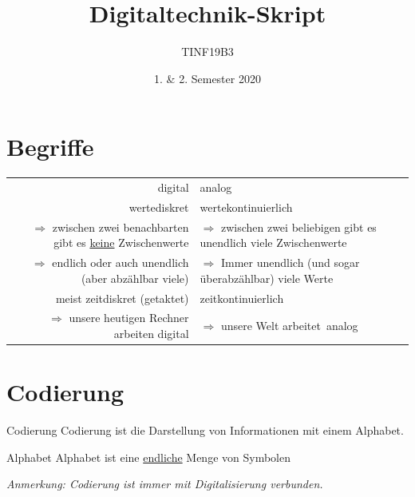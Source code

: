 \documentclass[10pt,a4paper]{scrartcl}
\author{TINF19B3}
\date{1. \& 2. Semester 2020}
\title{Digitaltechnik-Skript}
\begin{document}
\restoregeometry %
\nopagecolor%


	\newpage
	\tableofcontents
	\newpage
	\section{Begriffe}
	\begin{tabular}{r|l}
		digital & analog \\
		wertediskret & wertekontinuierlich\\
		$\Rightarrow$ zwischen zwei benachbarten gibt es \underline{keine} Zwischenwerte & $\Rightarrow$ zwischen zwei beliebigen gibt es unendlich viele Zwischenwerte \\
		$ \Rightarrow $ endlich oder auch unendlich (aber abzählbar viele) & $ \Rightarrow $ Immer unendlich (und sogar überabzählbar) viele Werte \\
		meist zeitdiskret (\glqq getaktet\grqq) & zeitkontinuierlich \\
		$ \Rightarrow $ unsere heutigen Rechner arbeiten digital & $ \Rightarrow $ unsere Welt \glqq arbeitet\grqq\ analog
	\end{tabular}

\section{Codierung}

	\begin{Theorem}{Codierung}{}
		Codierung ist die Darstellung von Informationen mit einem \glqq Alphabet\grqq.
	\end{Theorem}
		
	\begin{Theorem}{Alphabet}{}
		Alphabet ist eine \underline{endliche} Menge von Symbolen
	\end{Theorem}
	
	\textit{Anmerkung: Codierung ist immer mit Digitalisierung verbunden.} \\
	
\end{document}
